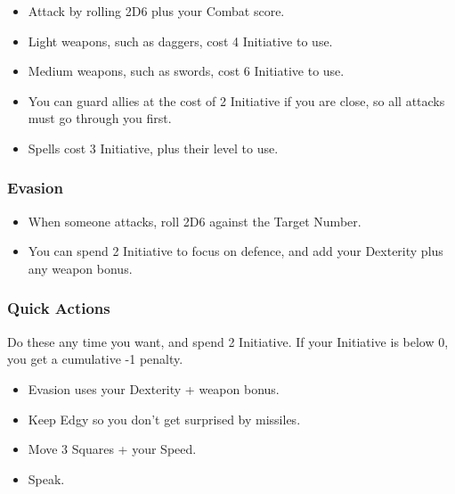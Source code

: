 \begin{multicols}{2}
\begin{itemize}

	\item{Attack by rolling 2D6 plus your Combat score.}
	\item{Light weapons, such as daggers, cost 4 Initiative to use.}
	\item{Medium weapons, such as swords, cost 6 Initiative to use.}
	\item{You can guard allies at the cost of 2 Initiative if you are close, so all attacks must go through you first.}
	\item{Spells cost 3 Initiative, plus their level to use.}

\end{itemize}

\subsubsection{Evasion}

\begin{itemize}

	\item{When someone attacks, roll 2D6 against the Target Number.}
	\item{You can spend 2 Initiative to focus on defence, and add your Dexterity plus any weapon bonus.}

\end{itemize}

\subsubsection{Quick Actions}

Do these any time you want, and spend 2 Initiative.
If your Initiative is below 0, you get a cumulative -1 penalty.

\begin{itemize}

	\item{Evasion uses your Dexterity + weapon bonus.}
	\item{Keep Edgy so you don't get surprised by missiles.}
	\item{Move 3 Squares + your Speed.}
	\item{Speak.}

\end{itemize}

\end{multicols}
